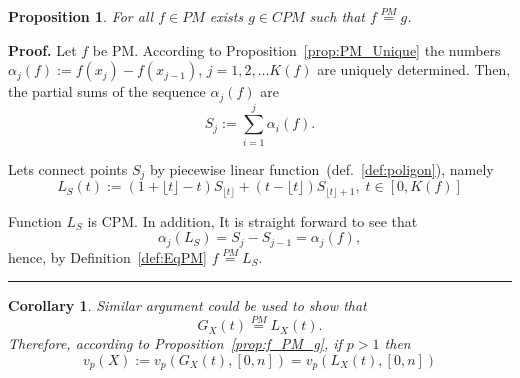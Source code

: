 \documentclass[12pt, a4paper]{article}
\newtheorem{proposition}[theorem]{Proposition}
\newtheorem{corollary}[theorem]{Corollary}
\newenvironment{proof}[1][Proof]{\noindent \textbf{#1.} }{\  \rule{0.5em}{0.5em}}
\numberwithin{equation}{section}
\begin{document}
\begin{proposition}\label{prop:PM2CPM}
  For all $f \in PM$ exists $g \in CPM$ such that $f \stackrel{PM}{=} g$.
\end{proposition} 
\begin{proof}
  Let $f$ be PM. According to Proposition~\ref{prop:PM_Unique} the
  numbers $\alpha_j(f):=f(x_j) - f(x_{j-1})$, $j=1,2,\dots K(f)$
  are uniquely determined.
  Then, the partial sums of the sequence $\alpha_j(f)$ are
  \begin{equation}
    S_j:=\sum_{i=1}^j \alpha_i(f).
  \end{equation}    

  Lets connect points $S_j$ by 
  piecewise linear function~(def.~\ref{def:poligon}), namely
  \begin{equation}
  L_S(t) := (1+\lfloor t \rfloor-t)S_{\lfloor t \rfloor} + (t-\lfloor t \rfloor)S_{\lfloor t \rfloor+1}   ,\;t\in[0,K(f)]
  \end{equation}  
   
  Function $L_S$ is CPM. In addition, 
  It is straight forward to see that 
  \begin{equation}
  \alpha_j(L_S)=S_j-S_{j-1}=\alpha_j(f),
  \end{equation}
  hence, by Definition~\ref{def:EqPM} $f \stackrel{PM}{=} L_S$.  
\end{proof}
\begin{corollary}\label{cor:PM2CPM}
  Similar argument could be used to show that
  \begin{equation}
    G_X(t)\stackrel{PM}{=}L_X(t).
  \end{equation}
  Therefore, according to Proposition~\ref{prop:f_PM_g}, if $p>1$ then
  \begin{equation}
    v_p(X) := v_p(G_X(t),[0,n])= v_p(L_X(t),[0,n])
  \end{equation}
\end{corollary}
\end{document}
